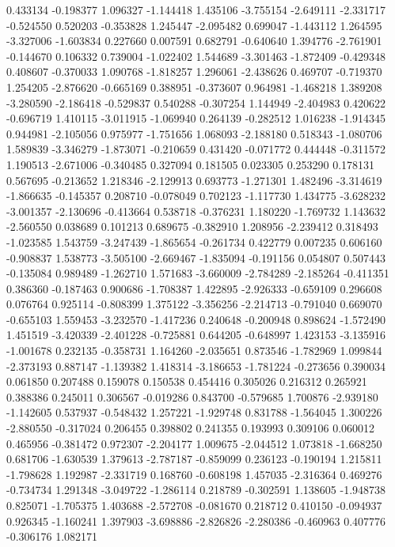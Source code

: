 0.433134
-0.198377
1.096327
-1.144418
1.435106
-3.755154
-2.649111
-2.331717
-0.524550
0.520203
-0.353828
1.245447
-2.095482
0.699047
-1.443112
1.264595
-3.327006
-1.603834
0.227660
0.007591
0.682791
-0.640640
1.394776
-2.761901
-0.144670
0.106332
0.739004
-1.022402
1.544689
-3.301463
-1.872409
-0.429348
0.408607
-0.370033
1.090768
-1.818257
1.296061
-2.438626
0.469707
-0.719370
1.254205
-2.876620
-0.665169
0.388951
-0.373607
0.964981
-1.468218
1.389208
-3.280590
-2.186418
-0.529837
0.540288
-0.307254
1.144949
-2.404983
0.420622
-0.696719
1.410115
-3.011915
-1.069940
0.264139
-0.282512
1.016238
-1.914345
0.944981
-2.105056
0.975977
-1.751656
1.068093
-2.188180
0.518343
-1.080706
1.589839
-3.346279
-1.873071
-0.210659
0.431420
-0.071772
0.444448
-0.311572
1.190513
-2.671006
-0.340485
0.327094
0.181505
0.023305
0.253290
0.178131
0.567695
-0.213652
1.218346
-2.129913
0.693773
-1.271301
1.482496
-3.314619
-1.866635
-0.145357
0.208710
-0.078049
0.702123
-1.117730
1.434775
-3.628232
-3.001357
-2.130696
-0.413664
0.538718
-0.376231
1.180220
-1.769732
1.143632
-2.560550
0.038689
0.101213
0.689675
-0.382910
1.208956
-2.239412
0.318493
-1.023585
1.543759
-3.247439
-1.865654
-0.261734
0.422779
0.007235
0.606160
-0.908837
1.538773
-3.505100
-2.669467
-1.835094
-0.191156
0.054807
0.507443
-0.135084
0.989489
-1.262710
1.571683
-3.660009
-2.784289
-2.185264
-0.411351
0.386360
-0.187463
0.900686
-1.708387
1.422895
-2.926333
-0.659109
0.296608
0.076764
0.925114
-0.808399
1.375122
-3.356256
-2.214713
-0.791040
0.669070
-0.655103
1.559453
-3.232570
-1.417236
0.240648
-0.200948
0.898624
-1.572490
1.451519
-3.420339
-2.401228
-0.725881
0.644205
-0.648997
1.423153
-3.135916
-1.001678
0.232135
-0.358731
1.164260
-2.035651
0.873546
-1.782969
1.099844
-2.373193
0.887147
-1.139382
1.418314
-3.186653
-1.781224
-0.273656
0.390034
0.061850
0.207488
0.159078
0.150538
0.454416
0.305026
0.216312
0.265921
0.388386
0.245011
0.306567
-0.019286
0.843700
-0.579685
1.700876
-2.939180
-1.142605
0.537937
-0.548432
1.257221
-1.929748
0.831788
-1.564045
1.300226
-2.880550
-0.317024
0.206455
0.398802
0.241355
0.193993
0.309106
0.060012
0.465956
-0.381472
0.972307
-2.204177
1.009675
-2.044512
1.073818
-1.668250
0.681706
-1.630539
1.379613
-2.787187
-0.859099
0.236123
-0.190194
1.215811
-1.798628
1.192987
-2.331719
0.168760
-0.608198
1.457035
-2.316364
0.469276
-0.734734
1.291348
-3.049722
-1.286114
0.218789
-0.302591
1.138605
-1.948738
0.825071
-1.705375
1.403688
-2.572708
-0.081670
0.218712
0.410150
-0.094937
0.926345
-1.160241
1.397903
-3.698886
-2.826826
-2.280386
-0.460963
0.407776
-0.306176
1.082171
